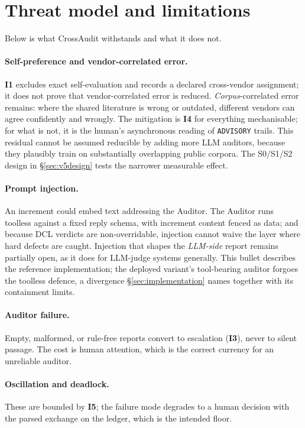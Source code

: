 \documentclass[11pt]{article}
\newcommand{\invariant}[1]{\textbf{I#1}}
\begin{document}
\section{Threat model and limitations}\label{sec:threat}

Below is what CrossAudit withstands and what it does not.

\paragraph{Self-preference and vendor-correlated error.} \invariant{1} excludes exact self-evaluation and records a declared cross-vendor assignment; it does not prove that vendor-correlated error is reduced. \emph{Corpus}-correlated error remains: where the shared literature is wrong or outdated, different vendors can agree confidently and wrongly. The mitigation is \invariant{4} for everything mechanisable; for what is not, it is the human's asynchronous reading of \texttt{ADVISORY} trails. This residual cannot be assumed reducible by adding more LLM auditors, because they plausibly train on substantially overlapping public corpora. The S0/S1/S2 design in \S\ref{sec:v5design} tests the narrower measurable effect.

\paragraph{Prompt injection.} An increment could embed text addressing the Auditor. The Auditor runs toolless against a fixed reply schema, with increment content fenced as data; and because DCL verdicts are non-overridable, injection cannot waive the layer where hard defects are caught. Injection that shapes the \emph{LLM-side} report remains partially open, as it does for LLM-judge systems generally. This bullet describes the reference implementation; the deployed variant's tool-bearing auditor forgoes the toolless defence, a divergence \S\ref{sec:implementation} names together with its containment limits.

\paragraph{Auditor failure.} Empty, malformed, or rule-free reports convert to escalation (\invariant{3}), never to silent passage. The cost is human attention, which is the correct currency for an unreliable auditor.

\paragraph{Oscillation and deadlock.} These are bounded by \invariant{5}; the failure mode degrades to a human decision with the parsed exchange on the ledger, which is the intended floor.
\end{document}
